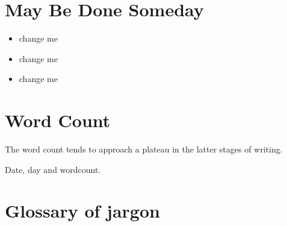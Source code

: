 \documentclass[10pt,letterpaper]{article}
\begin{document}
\begin{itemize}
\begin{itemize}
\section{May Be Done Someday}

\begin{itemize}
  \item change me
  \item change me
  \item change me
\end{itemize}


\section{Word Count}

The word count tends to approach a plateau in the latter stages of writing.

\begin{figure}[htp!]
  \centering
\end{figure}

\begin{table}[]
  \centering
  \caption{Date, day and wordcount.}
  \label{tab:my_label}
\end{table}


\section{Glossary of jargon}


\end{itemize}
\end{itemize}
\end{document}
